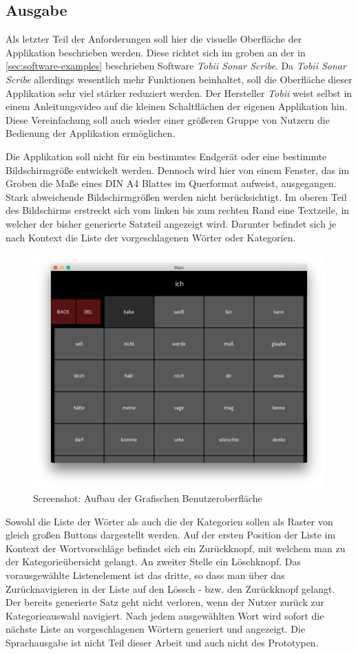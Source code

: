     \newpage
	\subsection{Ausgabe}
        
        Als letzter Teil der Anforderungen soll hier die visuelle Oberfläche der Applikation beschrieben werden. Diese richtet sich im groben an der in \autoref{sec:software-examples} beschrieben Software \emph{Tobii Sonar Scribe}. Da \emph{Tobii Sonar Scribe} allerdings wesentlich mehr Funktionen beinhaltet, soll die Oberfläche dieser Applikation sehr viel stärker reduziert werden. Der Hersteller \emph{Tobii} weist selbst in einem Anleitungsvideo auf die kleinen Schaltflächen der eigenen Applikation hin. \parencite[min. 0:53]{tobii:sonoScribeVideo} Diese Vereinfachung soll auch wieder einer größeren Gruppe von Nutzern die Bedienung der Applikation ermöglichen.
        
        Die Applikation soll nicht für ein bestimmtes Endgerät oder eine bestimmte Bildschirmgröße entwickelt werden. Dennoch wird hier von einem Fenster, das im Groben die Maße eines DIN A4 Blattes im Querformat aufweist, ausgegangen. Stark abweichende Bildschirmgrößen werden nicht berücksichtigt. Im oberen Teil des Bildschirms erstreckt sich vom linken bis zum rechten Rand eine Textzeile, in welcher der bisher generierte Satzteil angezeigt wird. Darunter befindet sich je nach Kontext die Liste der vorgeschlagenen Wörter oder Kategorien.
        
		\begin{figure}[H]
    		\centering
    		\includegraphics[width=.55\linewidth]{images/UI-Model.png}
    		\caption[Aufbau der Grafischen Benutzeroberfläche]{Screenshot: Aufbau der Grafischen Benutzeroberfläche}
    		\label{img:GUIBase}
		\end{figure}
        
        Sowohl die Liste der Wörter als auch die der Kategorien sollen als Raster von gleich großen Buttons dargestellt werden. Auf der ersten Position der Liste im Kontext der Wortvorschläge befindet sich ein Zurückknopf, mit welchem man zu der Kategorieübersicht gelangt. An zweiter Stelle ein Löschknopf. Das vorausgewählte Listenelement ist das dritte, so dass  man über das Zurücknavigieren in der Liste auf den Lössch - bzw. den Zurückknopf gelangt. Der bereits generierte Satz geht nicht verloren, wenn der Nutzer zurück zur Kategorieauswahl navigiert. Nach jedem ausgewählten Wort wird sofort die nächste Liste an vorgeschlagenen Wörtern generiert und angezeigt. Die Sprachausgabe ist nicht Teil dieser Arbeit und auch nicht des Prototypen.
	\newpage
